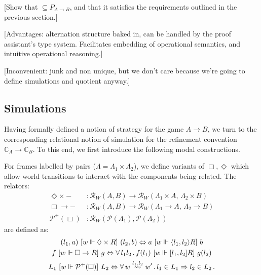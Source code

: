 [Show that $\subseteq P_{A \rightarrow B}$,
and that it satisfies the requirements outlined
in the previous section.]

[Advantages: alternation structure baked in,
can be handled by the proof assistant's type system.
Facilitates embedding of operational semantics,
and intuitive operational reasoning.]

[Inconvenient: junk and non unique,
but we don't care because we're going to
define simulations and quotient anyway.]



\subsection{Simulations} %
\label{sec:sim}

Having formally defined a notion of strategy
for the game $A \rightarrow B$,
we turn to the corresponding relational notion of simulation
for the refinement convention $\mathbb{C}_A \rightarrow \mathbb{C}_B$.
To this end,
we first introduce the following modal constructions.

\begin{definition} %
For frames labelled by pairs
($\Lambda = \Lambda_1 \times \Lambda_2$),
we define variants of $\Box, \Diamond$ which
allow world transitions to interact with the components
being related.
The relators:
\begin{align*}
  \Diamond \times {-} &: \mathcal{R}_W(A, B) \rightarrow
              \mathcal{R}_W(\Lambda_1 \times A, \, \Lambda_2 \times B) \\
  \Box \rightarrow - &: \mathcal{R}_W(A, B) \rightarrow
          \mathcal{R}_W(\Lambda_1 \rightarrow A, \, \Lambda_2 \rightarrow B) \\
  \mathcal{P}^+(\Box) &:
      \mathcal{R}_W(\mathcal{P}(\Lambda_1), \mathcal{P}(\Lambda_2))
\end{align*}
are defined as:
\begin{gather*}
  (l_1, a) \ [{w \Vdash \Diamond \times R}]\  (l_2, b) \Leftrightarrow
    a \ [{w \Vdash \langle l_1, l_2 \rangle R}]\  b \\
  f \ [{w \Vdash \Box \rightarrow R}]\  g \Leftrightarrow
    \forall \, l_1 l_2 \,.\, f(l_1) \ [{w \Vdash [l_1, l_2] R}]\  g(l_2) \\
  L_1 \ [{w \Vdash \mathcal{P}^+(\Box)}]\  L_2 \Leftrightarrow
    \forall \, w \stackrel{l_1, l_2}{\leadsto} w' \,.\,
      l_1 \in L_1 \Rightarrow l_2 \in L_2 \,.
\end{gather*}
\end{definition}

